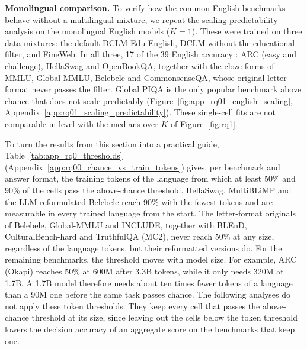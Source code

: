 \textbf{Monolingual comparison.} To verify how the common English benchmarks behave without a multilingual mixture, we repeat the scaling predictability analysis on the monolingual English models ($K=1$). These were trained on three data mixtures: the default DCLM-Edu English, DCLM without the educational filter, and FineWeb.
In all three, 17 of the 39 English accuracy : ARC (easy and challenge), HellaSwag and OpenBookQA, together with the cloze forms of MMLU, Global-MMLU, Belebele and CommonsenseQA, whose original letter format never passes the filter. Global PIQA is the only popular benchmark above chance that does not scale predictably (Figure~\ref{fig:app_rq01_english_scaling}, Appendix~\ref{app:rq01_scaling_predictability}).
These single-cell fits are not comparable in level with the medians over $K$ of Figure~\ref{fig:rq1}.


To turn the results from this section into a practical guide, Table~\ref{tab:app_rq0_thresholds} (Appendix~\ref{app:rq00_chance_vs_train_tokens}) gives, per benchmark and answer format, the training tokens of the language from which at least 50\% and 90\% of the cells pass the above-chance threshold.
HellaSwag, MultiBLiMP and the LLM-reformulated Belebele reach 90\% with the fewest tokens and are measurable in every trained language from the start. The letter-format originals of Belebele, Global-MMLU and INCLUDE, together with BLEnD, CulturalBench-hard and TruthfulQA (MC2), never reach 50\% at any size, regardless of the language tokens, but their reformatted versions do. %
For the remaining benchmarks, the threshold moves with model size. %
For example, ARC (Okapi) reaches 50\% at 600M after 3.3B tokens, while it only needs 320M at 1.7B. A 1.7B model therefore needs about ten times fewer tokens of a language than a 90M one before the same task passes chance.
The following analyses do not apply these token thresholds. They keep every cell that passes the above-chance threshold at its size, since leaving out the cells below the token threshold lowers the decision accuracy of an aggregate score on the benchmarks that keep one.

